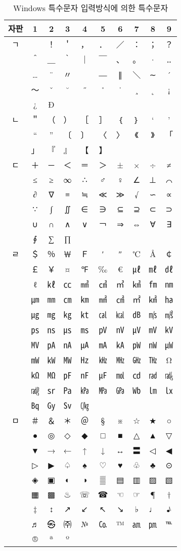\begin{table}
\centering
\begin{tabular}{cccccccccc}
\hline
자판 & 1 & 2 & 3 & 4 & 5 & 6 & 7 & 8 & 9 \\ \hline
ㄱ   & 　& ！& ＇&，&．&／&：&；&？\\
     &  ＾&＿&｀&｜&￣&、&。&·&‥ \\
     &  …&¨&〃&­&―&∥&＼&∼&´ \\
     & ～&ˇ&˘&˝&˚&˙&¸& \ifotfont\else˛\fi & ¡ \\
     & ¿ & \ifotfont\else Ð\fi \\ \hline
ㄴ & ＂&（&）&［&］&｛&｝&‘ & ’\\
   &“&”&〔&〕&〈&〉&《&》&「 \\
   &」&『&』&【&】 \\ \hline
ㄷ &＋&－&＜&＝&＞&±&×&÷&≠ \\
   &≤&≥&∞&∴&♂&♀&∠&⊥& ⌒\\
   &∂&∇&≡&≒&≪&≫&√&∽&∝\\
   &∵&∫&∬&∈&∋&⊆&⊇&⊂&⊃\\
   &∪&∩&∧&∨&￢&⇒&⇔&∀&∃\\
   &∮&∑&∏\\ \hline
ㄹ & ＄ & ％ & ￦ & Ｆ & ′ & ″ & ℃ & Å & ￠ \\
   & ￡ & ￥ & \ifotfont\else ¤\fi & ℉ & \ifotfont\else ‰\fi & \euro & ㎕ & ㎖ & ㎗ \\
   &ℓ&㎘&㏄&㎣&㎤&㎥&㎦&㎙&㎚\\
   &㎛&㎜&㎝&㎞&㎟&㎠&㎡&㎢&㏊\\
   &㎍&㎎&㎏&㏏&㎈&㎉&㏈&㎧&㎨\\
   &㎰&㎱&㎲&㎳&㎴&㎵&㎶&㎷&㎸\\
   &㎹&㎀&㎁&㎂&㎃&㎄&㎺&㎻&㎼\\
   &㎽&㎾&㎿&㎐&㎑&㎒&㎓&㎔&Ω\\
   &㏀&㏁&㎊&㎋&㎌&㏖&㏅&㎭&㎮\\
   &㎯&㏛&㎩&㎪&㎫&㎬&㏝&㏐&㏓\\
   &㏃&㏉&㏜&㏆ \\ \hline
ㅁ &＃&＆&＊&＠&§&※&☆&★&○\\
   &●&◎&◇&◆&□&■&△&▲&▽\\
   &▼&→&←&↑&↓&↔&〓&◁&◀\\
   &▷&▶&♤&♠&♡&♥&♧&♣&⊙\\
   &◈&▣&◐&◑&▒&▤&▥&▨&▧\\
   &▦&▩&♨&☏&☎&☜&☞&¶&†\\
   &‡&↕&↗&↙&↖&↘&♭&♩&♪\\
   &♬&㉿&㈜&№&㏇&™&㏂&㏘&℡\\
   &®&ª&º \\ \hline
\end{tabular}
\caption{Windows 특수문자 입력방식에 의한 특수문자}\label{tab:symbols}
\end{table}

